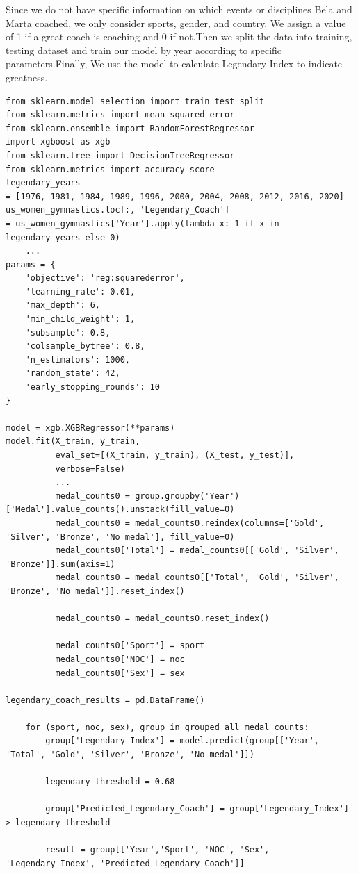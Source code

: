 Since we do not have specific information on which events or disciplines Bela and Marta coached, we only consider sports, gender, and country. We assign a value of 1 if a great coach is coaching and 0 if not.Then we split the data into training, testing dataset and train our model by year according to specific parameters.Finally, We use the model to calculate Legendary Index to indicate greatness.

\begin{lstlisting}[caption=Part of the Model]
from sklearn.model_selection import train_test_split
from sklearn.metrics import mean_squared_error
from sklearn.ensemble import RandomForestRegressor
import xgboost as xgb
from sklearn.tree import DecisionTreeRegressor
from sklearn.metrics import accuracy_score
legendary_years 
= [1976, 1981, 1984, 1989, 1996, 2000, 2004, 2008, 2012, 2016, 2020]
us_women_gymnastics.loc[:, 'Legendary_Coach'] 
= us_women_gymnastics['Year'].apply(lambda x: 1 if x in legendary_years else 0)
    ...
params = {
    'objective': 'reg:squarederror',
    'learning_rate': 0.01,
    'max_depth': 6,
    'min_child_weight': 1,
    'subsample': 0.8,
    'colsample_bytree': 0.8,
    'n_estimators': 1000,
    'random_state': 42,
    'early_stopping_rounds': 10
}

model = xgb.XGBRegressor(**params)
model.fit(X_train, y_train,
          eval_set=[(X_train, y_train), (X_test, y_test)], 
          verbose=False) 
          ...
          medal_counts0 = group.groupby('Year')['Medal'].value_counts().unstack(fill_value=0)
          medal_counts0 = medal_counts0.reindex(columns=['Gold', 'Silver', 'Bronze', 'No medal'], fill_value=0)
          medal_counts0['Total'] = medal_counts0[['Gold', 'Silver', 'Bronze']].sum(axis=1)
          medal_counts0 = medal_counts0[['Total', 'Gold', 'Silver', 'Bronze', 'No medal']].reset_index()
         
          medal_counts0 = medal_counts0.reset_index()
          
          medal_counts0['Sport'] = sport
          medal_counts0['NOC'] = noc
          medal_counts0['Sex'] = sex
          
legendary_coach_results = pd.DataFrame()

    for (sport, noc, sex), group in grouped_all_medal_counts:
        group['Legendary_Index'] = model.predict(group[['Year', 'Total', 'Gold', 'Silver', 'Bronze', 'No medal']])
              
        legendary_threshold = 0.68
            
        group['Predicted_Legendary_Coach'] = group['Legendary_Index'] > legendary_threshold
              
        result = group[['Year','Sport', 'NOC', 'Sex', 'Legendary_Index', 'Predicted_Legendary_Coach']]
          
\end{lstlisting}

